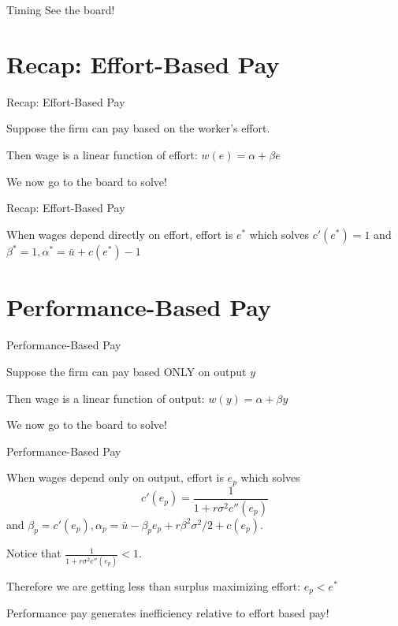 \documentclass[aspectratio=169,usenames,dvipsnames]{beamer}
\newenvironment{wideitemize}{\itemize\addtolength{\itemsep}{10pt}}{\enditemize}
\begin{document}
\begin{frame}{Timing}
\centering
    \huge See the board!
\end{frame}

\section{Recap: Effort-Based Pay}

\begin{frame}{Recap: Effort-Based Pay}
    \begin{wideitemize}
        \item Suppose the firm can pay based on the worker's effort.
        \item Then wage is a linear function of effort: $w(e)=\alpha + \beta e$
        \item We now go to the board to solve!
    \end{wideitemize}
\end{frame}
\begin{frame}{Recap: Effort-Based Pay}
    \begin{theorem}
        When wages depend directly on effort, effort is $e^*$ which solves $c'(e^*)=1$ and $\beta^*=1, \alpha^*=\bar u+c(e^*)-1$
    \end{theorem}

\end{frame}

\section{Performance-Based Pay}

\begin{frame}{Performance-Based Pay}
    \begin{wideitemize}
        \item Suppose the firm can pay based ONLY on output $y$
        \item Then wage is a linear function of output: $w(y)=\alpha + \beta y$
        \item We now go to the board to solve!
    \end{wideitemize}
\end{frame}

\begin{frame}{Performance-Based Pay}
    \begin{theorem}
        When wages depend only on output, effort is $e_{p}$ which solves 
        \[c'(e_{p})= \frac{1}{1+r \sigma^2 c''(e_{p})}\]
        and $\beta_{p} =c'(e_{p}),\alpha_{p} =\bar u - \beta_{p} e_{p}+r \beta^2\sigma^2/2+c(e_{p})$.
    \end{theorem}

    \begin{wideitemize}
        \item Notice that $\frac{1}{1+r \sigma^2 c''(e_{p})}<1$.
        \item Therefore we are getting less than surplus maximizing effort: $e_{p}<e^*$
        \item Performance pay generates inefficiency relative to effort based pay!
    \end{wideitemize}
\end{frame}
\end{document}
